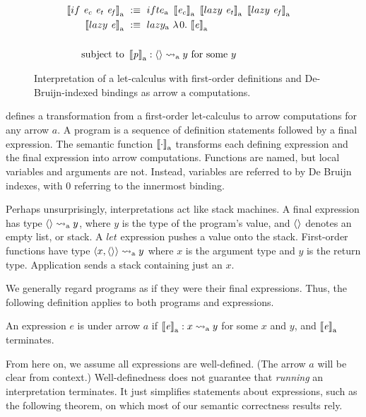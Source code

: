 \begin{figure}[!tb]
\begin{align*}
\begin{aligned}[t]
\\
	\meaningof{if~\mathit{e_c}~\mathit{e_t}~\mathit{e_f}}\gen &\ :\equiv\
		\arrowif\gen~
			\meaningof{\mathit{e_c}}\gen~
			\meaningof{lazy~\mathit{e_t}}\gen~
			\meaningof{lazy~\mathit{e_f}}\gen
\\
	\meaningof{lazy~\mathit{e}}\gen &\ :\equiv\ \arrowlazy\gen~\fun{0}{\meaningof{\mathit{e}}\gen}
\\
\\
	\text{subject to} &\ \meaningof{\mathit{p}}\gen : \pair{} \arrow\gen y \ \text{for some $y$}
\end{aligned}
\end{align*}
\bottomhrule
\caption[First-order semantics]{Interpretation of a let-calculus with first-order definitions and De-Bruijn-indexed bindings as arrow $\mathrm{a}$ computations.
}
\label{fig:semantic-function}
\end{figure}

 defines a transformation from a first-order let-calculus to arrow computations for any arrow $a$.
A program is a sequence of definition statements followed by a final expression.
The semantic function $\left\llbracket{\cdot}\right\rrbracket_\mathrm{a}$ transforms each defining expression and the final expression into arrow computations.
Functions are named, but local variables and arguments are not.
Instead, variables are referred to by De Bruijn indexes, with $0$ referring to the innermost binding.

Perhaps unsurprisingly, interpretations act like stack machines.
A final expression has type $\langle{}\rangle \rightsquigarrow_\mathrm{a} y$, where $y$ is the type of the program's value, and $\langle{}\rangle$ denotes an empty list, or stack.
A $let$ expression pushes a value onto the stack.
First-order functions have type $\langle{x,\langle{}\rangle}\rangle \rightsquigarrow_\mathrm{a} y$ where $x$ is the argument type and $y$ is the return type.
Application sends a stack containing just an $x$.

We generally regard programs as if they were their final expressions.
Thus, the following definition applies to both programs and expressions.

\begin{definition}
\label{def:well-defined-expression}
An expression $\mathit{e}$ is  under arrow $a$ if $\left\llbracket{\mathit{e}}\right\rrbracket_\mathrm{a} : x \rightsquigarrow_\mathrm{a} y$ for some $x$ and $y$, and $\left\llbracket{\mathit{e}}\right\rrbracket_\mathrm{a}$ terminates.
\end{definition}

From here on, we assume all expressions are well-defined.
(The arrow $a$ will be clear from context.)
Well-definedness does not guarantee that \emph{running} an interpretation terminates.
It just simplifies statements about expressions, such as the following theorem, on which most of our semantic correctness results rely.

